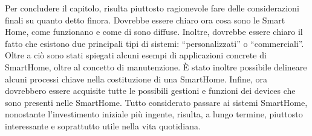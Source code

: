 Per concludere il capitolo, risulta piuttosto ragionevole fare delle considerazioni finali su quanto detto finora. Dovrebbe essere chiaro ora cosa sono le Smart Home, come funzionano e come di sono diffuse. Inoltre, dovrebbe essere chiaro il fatto che esistono due principali tipi di sistemi: “personalizzati” o “commerciali”. Oltre a ciò sono stati spiegati alcuni esempi di applicazioni concrete di SmartHome, oltre al concetto di manutenzione. È stato inoltre possibile delineare alcuni processi chiave nella costituzione di una SmartHome.
Infine, ora dovrebbero essere acquisite tutte le possibili gestioni e funzioni dei devices che sono presenti nelle SmartHome.
Tutto considerato passare ai sistemi SmartHome, nonostante l’investimento iniziale più ingente, risulta, a lungo termine, piuttosto interessante e soprattutto utile nella vita quotidiana.
